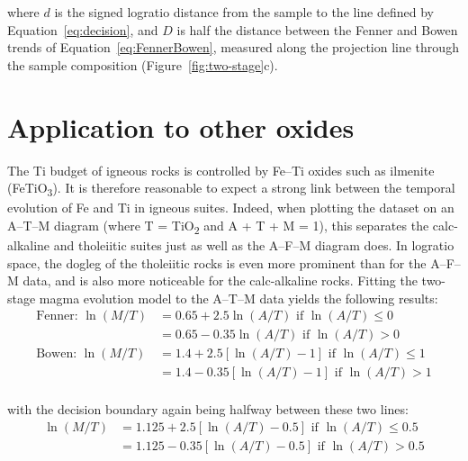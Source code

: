 \documentclass{article}
\begin{document}
\noindent where $d$ is the signed logratio distance from the sample to
the line defined by Equation~\ref{eq:decision}, and $D$ is half the
distance between the Fenner and Bowen trends of
Equation~\ref{eq:FennerBowen}, measured along the projection line
through the sample composition (Figure~\ref{fig:two-stage}c).

\section{Application to other oxides}

The Ti budget of igneous rocks is controlled by Fe--Ti oxides such as
ilmenite (FeTiO\textsubscript{3}). It is therefore reasonable to
expect a strong link between the temporal evolution of Fe and Ti in
igneous suites.  Indeed, when plotting the \citet{rollinson2021}
dataset on an A--T--M diagram (where T = TiO\textsubscript{2} and A +
T + M = 1), this separates the calc-alkaline and tholeiitic suites
just as well as the A--F--M diagram does. In logratio space, the
dogleg of the tholeiitic rocks is even more prominent than for the
A--F--M data, and is also more noticeable for the calc-alkaline
rocks. Fitting the two-stage magma evolution model to the A--T--M data
yields the following results:
\begin{equation}
  \begin{split}
    \mbox{Fenner:~} \ln(M/T) & = 0.65 + 2.5 \ln(A/T)
    \mbox{~if~} \ln(A/T)\leq{0}\\
    \phantom{\mbox{Tenner:~} \ln(M/T)} & = 0.65 - 0.35 \ln(A/T)
    \mbox{~if~} \ln(A/T)>{0}\\
    \mbox{Bowen:~} \ln(M/T) & = 1.4 + 2.5 [\ln(A/T)-1]
    \mbox{~if~} \ln(A/T)\leq{1}\\
    \phantom{\mbox{Bowen:~} \ln(M/T)} & = 1.4 -0.35 [\ln(A/T)-1]
    \mbox{~if~} \ln(A/T)>{1}\\
  \end{split}
  \label{eq:ATMFB}
\end{equation}

\noindent with the decision boundary again being halfway between these
two lines:
\begin{equation}
  \begin{split}
    \ln(M/T) & = 1.125 + 2.5 [\ln(A/T)-0.5] \mbox{~if~} \ln(A/T)\leq{0.5}\\
    \phantom{\ln(M/T)} & = 1.125 - 0.35 [\ln(A/T)-0.5] \mbox{~if~} \ln(A/T)>{0.5}\\
  \end{split}
  \label{eq:ATMdecision}
\end{equation}
\end{document}
